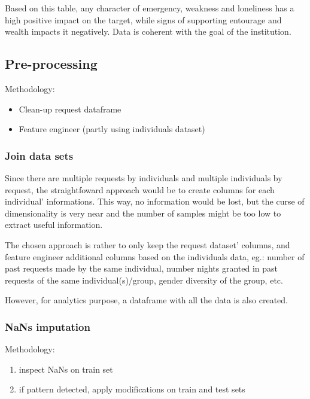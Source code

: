 \documentclass[11pt]{article}
\def\wl{\par \vspace{\baselineskip}}
\theoremstyle{definition}
\begin{document}
        Based on this table, any character of emergency, weakness and loneliness has a high positive impact on the target, while signs of supporting entourage and wealth impacts it negatively. Data is coherent with the goal of the institution.


    \subsection{Pre-processing}

        Methodology:
        \begin{itemize}
            \item Clean-up request dataframe
            \item Feature engineer (partly using individuals dataset)
        \end{itemize}


        \subsubsection{Join data sets}
            Since there are multiple requests by individuals and multiple individuals by request, the straightfoward approach would be to create columns for each individual' informations. This way, no information would be lost, but the curse of dimensionality is very near and the number of samples might be too low to extract useful information.\wl

            The chosen approach is rather to only keep the request dataset' columns, and feature engineer additional columns based on the individuals data, eg.: number of past requests made by the same individual, number nights granted in past requests of the same individual(s)/group, gender diversity of the group, etc.\wl

            However, for analytics purpose, a dataframe with all the data is also created.

    
        \subsubsection{NaNs imputation}
            
            Methodology:
            
            \begin{enumerate}
                \item inspect NaNs on train set
                \item if pattern detected, apply modifications on train and test sets
            \end{enumerate}
            
\end{document}
